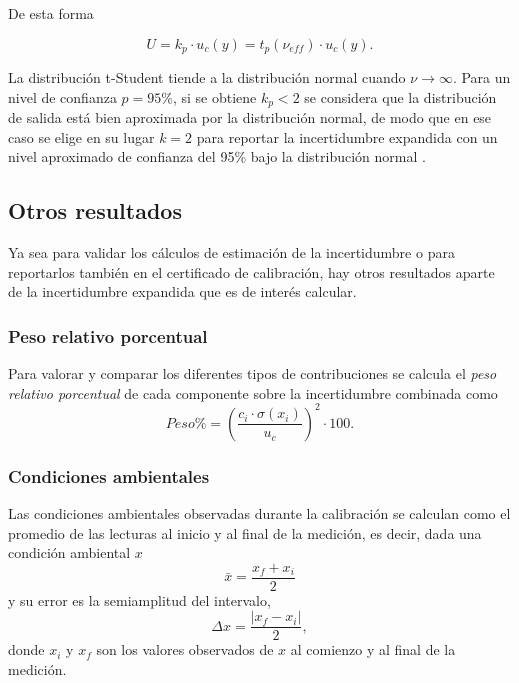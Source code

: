 De esta forma

\begin{equation}
    U = k_p \cdot u_c(y) = t_p(\nu_{eff}) \cdot u_c(y).    
\end{equation}

La distribución t-Student tiende a la distribución normal cuando $\nu \longrightarrow \infty$. Para un nivel de confianza $p = 95\%$, si se obtiene $k_p<2$ se considera que la distribución de salida está bien aproximada por la distribución normal, de modo que en ese caso se elige en su lugar $k=2$ para reportar la incertidumbre expandida con un nivel aproximado de confianza del 95\% bajo la distribución normal \cite{GUMG.6.4}. 

\subsection{Otros resultados}

Ya sea para validar los cálculos de estimación de la incertidumbre o para reportarlos también en el certificado de calibración, hay otros resultados aparte de la incertidumbre expandida que es de interés calcular.

\subsubsection{Peso relativo porcentual}

Para valorar y comparar los diferentes tipos de contribuciones se calcula el \textit{peso relativo porcentual} de cada componente sobre la incertidumbre combinada como
\begin{equation}
    \textit{Peso}\% = \left(\frac{c_i \cdot \sigma(x_i)}{u_c}\right)^{2} \cdot 100.
\end{equation}
\subsubsection{Condiciones ambientales}

Las condiciones ambientales observadas durante la calibración se calculan como el promedio de las lecturas al inicio y al final de la medición, es decir, dada una condición ambiental $x$
\begin{equation}
    \bar{x} = \frac{x_f+x_i}{2}
\end{equation}
y su error es la semiamplitud del intervalo,
\begin{equation}
    \Delta x = \frac{|x_f-x_i|}{2},
\end{equation}
donde $x_i$ y $x_f$ son los valores observados de $x$ al comienzo y al final de la medición. 

